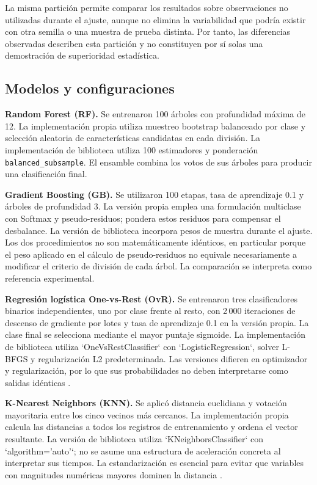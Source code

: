 La misma partici\'on permite comparar los resultados sobre observaciones no utilizadas durante el ajuste, aunque no elimina la variabilidad que podr\'ia existir con otra semilla o una muestra de prueba distinta. Por tanto, las diferencias observadas describen esta partici\'on y no constituyen por s\'i solas una demostraci\'on de superioridad estad\'istica.

\subsection{Modelos y configuraciones}
\textbf{Random Forest (RF).} Se entrenaron 100 \'arboles con profundidad m\'axima de 12. La implementaci\'on propia utiliza muestreo bootstrap balanceado por clase y selecci\'on aleatoria de caracter\'isticas candidatas en cada divisi\'on. La implementaci\'on de biblioteca utiliza 100 estimadores y ponderaci\'on \texttt{balanced\_subsample}. El ensamble combina los votos de sus \'arboles para producir una clasificaci\'on final.

\textbf{Gradient Boosting (GB).} Se utilizaron 100 etapas, tasa de aprendizaje 0.1 y \'arboles de profundidad 3. La versi\'on propia emplea una formulaci\'on multiclase con Softmax y pseudo-residuos; pondera estos residuos para compensar el desbalance. La versi\'on de biblioteca incorpora pesos de muestra durante el ajuste. Los dos procedimientos no son matem\'aticamente id\'enticos, en particular porque el peso aplicado en el c\'alculo de pseudo-residuos no equivale necesariamente a modificar el criterio de divisi\'on de cada \'arbol. La comparaci\'on se interpreta como referencia experimental.

\textbf{Regresi\'on log\'istica One-vs-Rest (OvR).} Se entrenaron tres clasificadores binarios independientes, uno por clase frente al resto, con 2\,000 iteraciones de descenso de gradiente por lotes y tasa de aprendizaje 0.1 en la versi\'on propia. La clase final se selecciona mediante el mayor puntaje sigmoide. La implementaci\'on de biblioteca utiliza `OneVsRestClassifier` con `LogisticRegression`, solver L-BFGS y regularizaci\'on L2 predeterminada. Las versiones difieren en optimizador y regularizaci\'on, por lo que sus probabilidades no deben interpretarse como salidas id\'enticas \parencite{pedregosa2011}.

\textbf{K-Nearest Neighbors (KNN).} Se aplic\'o distancia euclidiana y votaci\'on mayoritaria entre los cinco vecinos m\'as cercanos. La implementaci\'on propia calcula las distancias a todos los registros de entrenamiento y ordena el vector resultante. La versi\'on de biblioteca utiliza `KNeighborsClassifier` con `algorithm='auto'`; no se asume una estructura de aceleraci\'on concreta al interpretar sus tiempos. La estandarizaci\'on es esencial para evitar que variables con magnitudes num\'ericas mayores dominen la distancia \parencite{pedregosa2011}.

